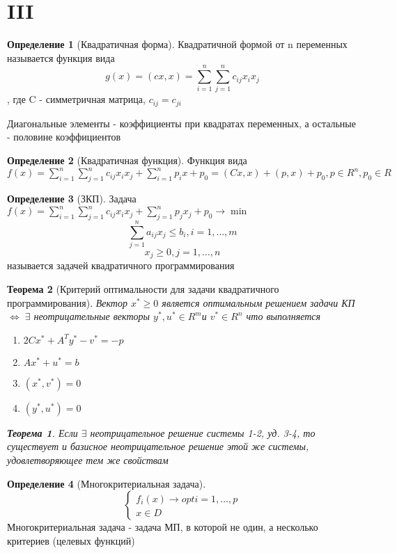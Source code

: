 \documentclass[a4paper]{article}
\newtheorem{theorem}{Теорема}[section]
\theoremstyle{definition}
\newtheorem*{definition}{Определение}
\theoremstyle{remark}
\begin{document}
\section{III}
\begin{definition}[Квадратичная форма]
	Квадратичной формой от n переменных называется функция вида
	\[g(x)  = (cx, x) = \sum_{i=1}^{n}\sum_{j=1}^{n}c_{ij}x_i x_j\], где C - симметричная матрица, $c_{ij} = c_{ji}$

	Диагональные элементы - коэффициенты при квадратах переменных, а остальные - половине коэффициентов
\end{definition}
\begin{definition}[Квадратичная функция]
	Функция вида $f(x) = \sum_{i = 1}^n \sum _{j = 1}^nc_{ij}x_i x_j +\sum_{i = 1}^n p_i x + p_0 = (Cx, x) + (p, x) + p_0, p \in R^n, p_0\in R$
\end{definition}
\begin{definition}[ЗКП]
	Задача $f(x) = \sum_{i=1}^{n}\sum_{j=1}^{n} c_{ij}x_i x_j +\sum_{j  = 1}^{n}p_j x_j +p_0\to \min$
	\[\sum_{j = 1}^n a_{ij}x_j \le b_i, i = 1, \dots, m\]
	\[x_j\ge 0, j = 1, \dots, n\]
	называется задачей квадратичного программирования
\end{definition}
\begin{theorem}[Критерий оптимальности для задачи квадратичного программирования]
	Вектор $x^*\ge 0$ является оптимальным решением задачи КП $\Leftrightarrow \; \exists$ неотрицательные векторы $y^*, u^*\in R^m$и $v^*\in R^n$ что выполняется
	\begin{enumerate}
		\item $2Cx^* + A^T y^* - v^* = -p$
		\item $Ax^* + u^* = b$
		\item $(x^*, v^*) = 0$
		\item $(y^*, u^*) = 0$
	\end{enumerate}
	\begin{theorem}
		Если $\exists$ неотрицательное решение системы 1-2, уд. 3-4, то существует и базисное неотрицательное решение этой же системы, удовлетворяющее тем же свойствам
	\end{theorem}
\end{theorem}
\begin{definition}[Многокритериальная задача]
	\[\begin{cases}
			f_i(x)\to opt i = 1, \dots, p \\
			x\in D
		\end{cases}\]
	Многокритериальная задача - задача МП, в которой не один, а несколько критериев (целевых функций)
\end{definition}
\end{document}
